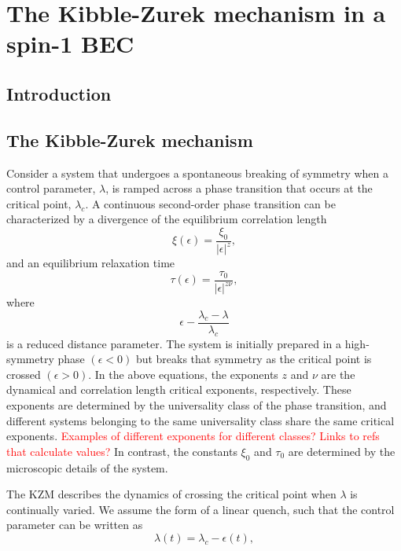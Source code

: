 \chapter{The Kibble-Zurek mechanism in a spin-1 BEC}


\section{Introduction}

\section{The Kibble-Zurek mechanism}\label{sec:the-KZM}
Consider a system that undergoes a spontaneous breaking of symmetry when a
control parameter, $\lambda$, is ramped across a phase transition that occurs
at the critical point, $\lambda_c$.
A continuous second-order phase transition can be characterized by a divergence
of the equilibrium correlation length
\begin{equation}
    \xi(\epsilon) = \frac{\xi_0}{|\epsilon|^z},
\end{equation}
and an equilibrium relaxation time
\begin{equation}
    \tau(\epsilon) = \frac{\tau_0}{|\epsilon|^{z\nu}},
    \label{eq: equil-relax-time}
\end{equation}
where
\begin{equation}
    \epsilon - \frac{\lambda_c - \lambda}{\lambda_c}
\end{equation}
is a reduced distance parameter.
The system is initially prepared in a high-symmetry phase $(\epsilon < 0)$ but 
breaks that symmetry as the critical point is crossed $(\epsilon > 0)$.
In the above equations, the exponents $z$ and $\nu$ are the dynamical and
correlation length critical exponents, respectively.
These exponents are determined by the universality class of the phase
transition, and different systems belonging to the same universality class share
the same critical exponents.
\textcolor{red}{Examples of different exponents for different classes? Links
to refs that calculate values?}
In contrast, the constants $\xi_0$ and $\tau_0$ are determined by the
microscopic details of the system. \par
The KZM describes the dynamics of crossing the critical point when $\lambda$ 
is continually varied.
We assume the form of a linear quench, such that the control parameter can be
written as
\begin{equation}
    \lambda(t) = \lambda_c - \epsilon(t),
\end{equation}
